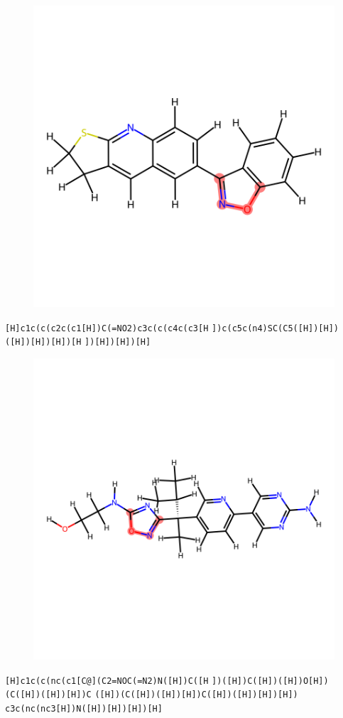 \documentclass{article}
\begin{document}
\begin{figure}[ht]
\centering
    \includegraphics{mol234.png}
\end{figure}
\verb|[H]c1c(c(c2c(c1[H])C(=NO2)c3c(c(c4c(c3[H| \verb|])c(c5c(n4)SC(C5([H])[H])([H])[H])[H])[H| \verb|])[H])[H])[H]|

\begin{figure}[ht]
\centering
    \includegraphics{mol235.png}
\end{figure}
\verb|[H]c1c(c(nc(c1[C@](C2=NOC(=N2)N([H])C([H| \verb|])([H])C([H])([H])O[H])(C([H])([H])[H])C| \verb|([H])(C([H])([H])[H])C([H])([H])[H])[H])| \verb|c3c(nc(nc3[H])N([H])[H])[H])[H]|
\end{document}
